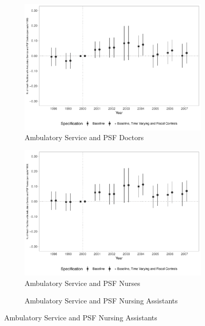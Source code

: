 \begin{figure}[h!]
\begin{center}
\begin{subfigure}{0.32\textwidth}
        \centering
        \caption{\scriptsize Ambulatory Service and PSF Doctors}\label{fig:13e}
        \includegraphics[width=\textwidth]{plots/sia_ncnes_medpsf_pcapita_dist_ec29_baseline_dist_ec29_baseline_13.pdf}
    \end{subfigure}
    \begin{subfigure}{0.32\textwidth}
        \centering
        \caption{\scriptsize Ambulatory Service and PSF Nurses}\label{fig:13f}
        \includegraphics[width=\textwidth]{plots/sia_ncnes_enfpsf_pcapita_dist_ec29_baseline_dist_ec29_baseline_13.pdf}
    \end{subfigure}
        \begin{subfigure}{0.32\textwidth}
        \caption{\scriptsize Ambulatory Service and PSF Nursing Assistants}\label{fig:13g}
        \centering

\end{subfigure}
\end{center}
\end{figure}
